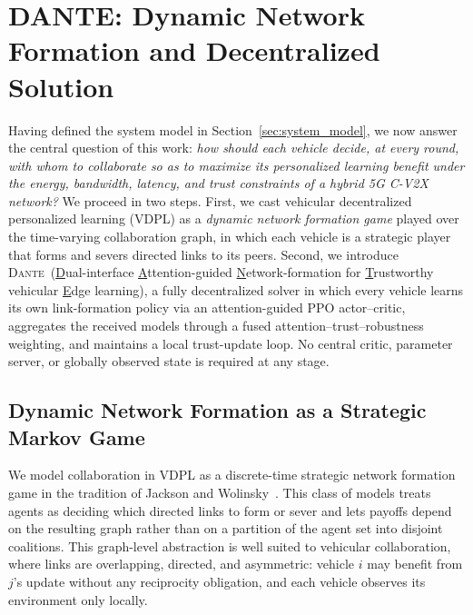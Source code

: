\section{DANTE: Dynamic Network Formation and Decentralized Solution}
\label{sec:dante}

Having defined the system model in Section~\ref{sec:system_model}, we now answer the central question of this work: \emph{how should each vehicle decide, at every round, with whom to collaborate so as to maximize its personalized learning benefit under the energy, bandwidth, latency, and trust constraints of a hybrid 5G C-V2X network?} We proceed in two steps. First, we cast vehicular decentralized personalized learning (VDPL) as a \emph{dynamic network formation game} played over the time-varying collaboration graph, in which each vehicle is a strategic player that forms and severs directed links to its peers. Second, we introduce \textsc{Dante}~(\underline{D}ual-interface \underline{A}ttention-guided \underline{N}etwork-formation for \underline{T}rustworthy vehicular \underline{E}dge learning), a fully decentralized solver in which every vehicle learns its own link-formation policy via an attention-guided PPO actor--critic, aggregates the received models through a fused attention--trust--robustness weighting, and maintains a local trust-update loop. No central critic, parameter server, or globally observed state is required at any stage.

\subsection{Dynamic Network Formation as a Strategic Markov Game}
\label{subsec:game}

We model collaboration in VDPL as a discrete-time strategic network formation game in the tradition of Jackson and Wolinsky~\cite{jackson1996strategic,bala2000noncooperative,jackson2002evolution}. This class of models treats agents as deciding which directed links to form or sever and lets payoffs depend on the resulting graph rather than on a partition of the agent set into disjoint coalitions. This graph-level abstraction is well suited to vehicular collaboration, where links are overlapping, directed, and asymmetric: vehicle $i$ may benefit from $j$'s update without any reciprocity obligation, and each vehicle observes its environment only locally.


